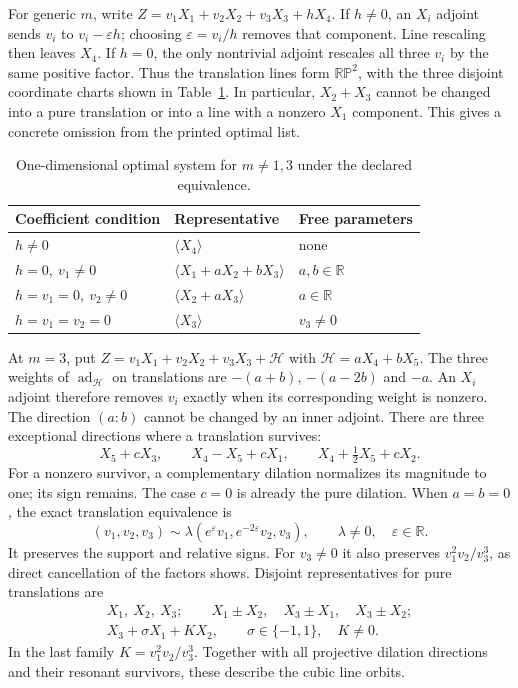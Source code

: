 For generic $m$, write $Z=v_1X_1+v_2X_2+v_3X_3+hX_4$.
If $h\ne0$, an $X_i$ adjoint sends $v_i$ to $v_i-\varepsilon h$;
choosing $\varepsilon=v_i/h$ removes that component. Line rescaling then
leaves $X_4$. If $h=0$, the only nontrivial adjoint rescales all three
$v_i$ by the same positive factor. Thus the translation lines form
$\mathbb{RP}^2$, with the three disjoint coordinate charts shown in
Table~\ref{tab:sve-optimal-generic}. In particular, $X_2+X_3$ cannot
be changed into a pure translation or into a line with a nonzero $X_1$
component. This gives a concrete omission from the printed optimal list.
\begin{table}[htbp]
\centering\small
\begin{tabular}{@{}lll@{}}
\toprule
Coefficient condition & Representative & Free parameters\\
\midrule
$h\ne0$ & $\langle X_4\rangle$ & none\\
$h=0,\ v_1\ne0$ & $\langle X_1+aX_2+bX_3\rangle$ & $a,b\in\mathbb R$\\
$h=v_1=0,\ v_2\ne0$ & $\langle X_2+aX_3\rangle$ & $a\in\mathbb R$\\
$h=v_1=v_2=0$ & $\langle X_3\rangle$ & $v_3\ne0$\\
\bottomrule
\end{tabular}
\caption{One-dimensional optimal system for $m\ne1,3$ under the declared equivalence.}
\label{tab:sve-optimal-generic}
\end{table}

At $m=3$, put $Z=v_1X_1+v_2X_2+v_3X_3+\mathcal H$ with
$\mathcal H=aX_4+bX_5$. The three weights of
$\operatorname{ad}_{\mathcal H}$ on translations are
$-(a+b)$, $-(a-2b)$ and $-a$. An $X_i$ adjoint therefore removes
$v_i$ exactly when its corresponding weight is nonzero. The direction
$(a:b)$ cannot be changed by an inner adjoint. There are three exceptional
directions where a translation survives:
\[
 X_5+cX_3,\qquad X_4-X_5+cX_1,\qquad
 X_4+\tfrac12X_5+cX_2.
\]
For a nonzero survivor, a complementary dilation normalizes its magnitude
to one; its sign remains. The case $c=0$ is already the pure dilation.
When $a=b=0$, the exact translation equivalence is
\begin{equation}
 (v_1,v_2,v_3)\sim\lambda(e^\varepsilon v_1,e^{-2\varepsilon}v_2,v_3),
 \qquad \lambda\ne0,\quad\varepsilon\in\mathbb R.
 \label{eq:sve-translation-orbits}
\end{equation}
It preserves the support and relative signs. For $v_3\ne0$ it also
preserves $v_1^2v_2/v_3^3$, as direct cancellation of the factors shows.
Disjoint representatives for pure translations are
\[
 \begin{gathered}
 X_1,\ X_2,\ X_3;\qquad X_1\pm X_2,\quad X_3\pm X_1,\quad X_3\pm X_2;\\
 X_3+\sigma X_1+KX_2,\qquad \sigma\in\{-1,1\},\quad K\ne0.
 \end{gathered}
\]
In the last family $K=v_1^2v_2/v_3^3$. Together with all projective
dilation directions and their resonant survivors, these describe the
cubic line orbits.


